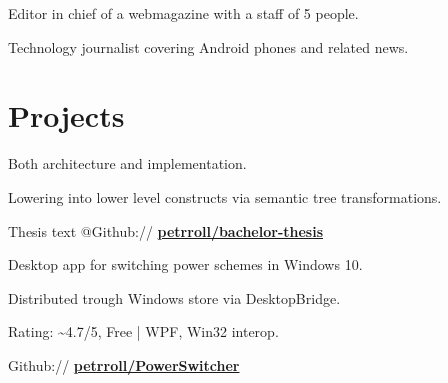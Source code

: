 \documentclass[a4paper]{deedy-resume} %
\begin{document}
\begin{minipage}[t]{0.66\textwidth}

\begin{tightitemize}
\item Editor in chief of a webmagazine with a staff of 5 people.
\item Technology journalist covering Android phones and related news.
\end{tightitemize}


\sectionspace %


\section{Projects}

\begin{tightitemize}
\item Both architecture and implementation.
\item Lowering into lower level constructs via semantic tree transformations.
\item Thesis text @Github:// \href{https://github.com/petrroll/bachelor-thesis}{\bf petrroll/bachelor-thesis}
\end{tightitemize}
\sectionspace %


\emptyLocation %
\begin{tightitemize}
\item Desktop app for switching power schemes in Windows 10.
\item Distributed trough Windows store via DesktopBridge.
\item Rating: \textasciitilde4.7/5, Free | WPF, Win32 interop.
\item Github:// \href{https://github.com/petrroll/PowerSwitcher}{\bf petrroll/PowerSwitcher}
\end{tightitemize}

\sectionspace %



\end{minipage}
\end{document}
